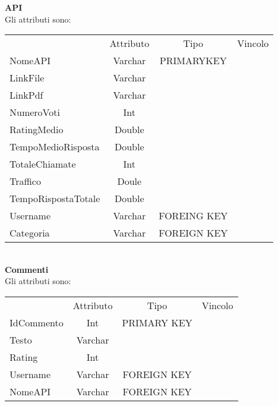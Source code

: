 {{		\textbf{API}\\
			Gli attributi sono:
			\begin{center}
			\begin{tabular}{lccc}
				&Attributo&Tipo&Vincolo\\
				NomeAPI&Varchar&PRIMARYKEY\\
				LinkFile&Varchar& \\
				LinkPdf&Varchar& \\
				NumeroVoti&Int& \\
				RatingMedio&Double& \\
				TempoMedioRisposta&Double& \\
				TotaleChiamate&Int& \\
				Traffico&Doule& \\
				TempoRispostaTotale&Double& \\
				Username&Varchar&FOREING KEY\\
				Categoria&Varchar&FOREIGN KEY\\
			\end{tabular}
			\end{center}\\
			
		\textbf{Commenti}\\
			Gli attributi sono:
			\begin{center}
			\begin{tabular}{lccc}
				&Attributo&Tipo&Vincolo\\
				IdCommento&Int&PRIMARY KEY\\
				Testo&Varchar& \\
				Rating&Int& \\
				Username&Varchar&FOREIGN KEY\\
				NomeAPI&Varchar&FOREIGN KEY\\
			\end{tabular}
			\end{center}\\
		
}}
